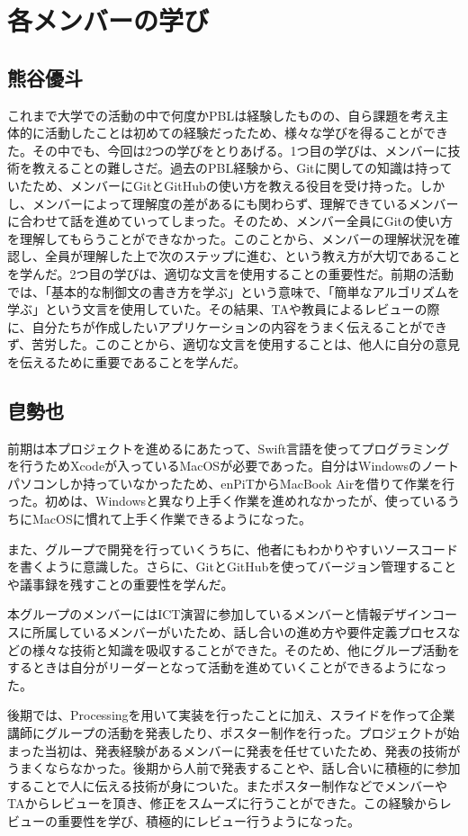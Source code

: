\documentclass[openany,11pt,papersize]{jsbook}
\begin{document}

\section{各メンバーの学び}
\subsection{熊谷優斗}
\par これまで大学での活動の中で何度かPBLは経験したものの、自ら課題を考え主体的に活動したことは初めての経験だったため、様々な学びを得ることができた。その中でも、今回は2つの学びをとりあげる。1つ目の学びは、メンバーに技術を教えることの難しさだ。過去のPBL経験から、Gitに関しての知識は持っていたため、メンバーにGitとGitHubの使い方を教える役目を受け持った。しかし、メンバーによって理解度の差があるにも関わらず、理解できているメンバーに合わせて話を進めていってしまった。そのため、メンバー全員にGitの使い方を理解してもらうことができなかった。このことから、メンバーの理解状況を確認し、全員が理解した上で次のステップに進む、という教え方が大切であることを学んだ。2つ目の学びは、適切な文言を使用することの重要性だ。前期の活動では、「基本的な制御文の書き方を学ぶ」という意味で、「簡単なアルゴリズムを学ぶ」という文言を使用していた。その結果、TAや教員によるレビューの際に、自分たちが作成したいアプリケーションの内容をうまく伝えることができず、苦労した。このことから、適切な文言を使用することは、他人に自分の意見を伝えるために重要であることを学んだ。

\subsection{皀勢也}
前期は本プロジェクトを進めるにあたって、Swift言語を使ってプログラミングを行うためXcodeが入っているMacOSが必要であった。自分はWindowsのノートパソコンしか持っていなかったため、enPiTからMacBook Airを借りて作業を行った。初めは、Windowsと異なり上手く作業を進めれなかったが、使っているうちにMacOSに慣れて上手く作業できるようになった。
\par
また、グループで開発を行っていくうちに、他者にもわかりやすいソースコードを書くように意識した。さらに、GitとGitHubを使ってバージョン管理することや議事録を残すことの重要性を学んだ。
\par
本グループのメンバーにはICT演習に参加しているメンバーと情報デザインコースに所属しているメンバーがいたため、話し合いの進め方や要件定義プロセスなどの様々な技術と知識を吸収することができた。そのため、他にグループ活動をするときは自分がリーダーとなって活動を進めていくことができるようになった。
\par
後期では、Processingを用いて実装を行ったことに加え、スライドを作って企業講師にグループの活動を発表したり、ポスター制作を行った。プロジェクトが始まった当初は、発表経験があるメンバーに発表を任せていたため、発表の技術がうまくならなかった。後期から人前で発表することや、話し合いに積極的に参加することで人に伝える技術が身についた。またポスター制作などでメンバーやTAからレビューを頂き、修正をスムーズに行うことができた。この経験からレビューの重要性を学び、積極的にレビュー行うようになった。
\end{document}

